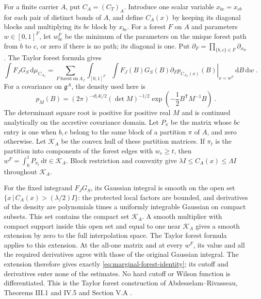 \documentclass[11pt]{article}
\newcommand{\dd}{\mathrm{d}}
\begin{document}
For a finite carrier $A$, put $C_A=(C_T)_A$. Introduce one scalar variable $x_{bc}=x_{cb}$ for each pair of distinct bonds of $A$, and define $C_A(x)$ by keeping its diagonal blocks and multiplying its $bc$ block by $x_{bc}$. For a forest $F$ on $A$ and parameters $w\in [0,1]^F$, let $w^F_{bc}$ be the minimum of the parameters on the unique forest path from $b$ to $c$, or zero if there is no path; its diagonal is one. Put $\partial_F=\prod_{\{b,c\}\in F}\partial_{x_{bc}}$. The Taylor forest formula gives
\begin{equation}\label{eq:marginal-forest-identity}
    \int F_JG_S\,\dd\mu_{C_{A_J}}
        =\sum_{F\ \mathrm{forest\ on}\ A_J}
            \int_{[0,1]^F}\int F_J(B)G_S(B)
                \left.\partial_F p_{C_{A_J}(x)}(B)\right|_{x=w^F}
                    \,\dd B\,\dd w\;.
\end{equation}
For a covariance on $\mathfrak g^A$, the density used here is
\begin{equation}\label{eq:marginal-density-definition}
    p_M(B)=(2\pi)^{-d|A|/2}(\det M)^{-1/2}
        \exp\left(-\frac{1}{2}B^{\mathsf T}M^{-1}B\right)\;.
\end{equation}
The determinant square root is positive for positive real $M$ and is continued analytically on the accretive covariance domain. Let $P_\pi$ be the matrix whose $bc$ entry is one when $b,c$ belong to the same block of a partition $\pi$ of $A$, and zero otherwise. Let $\mathcal K_A$ be the convex hull of these partition matrices. If $\pi_t$ is the partition into components of the forest edges with $w_e\geq t$, then $w^F=\int_0^1P_{\pi_t}\,\dd t\in \mathcal K_A$. Block restriction and convexity give $\lambda I\leq C_A(x)\leq\Lambda I$ throughout $\mathcal K_A$.

For the fixed integrand $F_JG_S$, its Gaussian integral is smooth on the open set $\{x\, | \,C_A(x)>(\lambda/2)I\}$: the protected local factors are bounded, and derivatives of the density are polynomials times a uniformly integrable Gaussian on compact subsets. This set contains the compact set $\mathcal K_A$. A smooth multiplier with compact support inside this open set and equal to one near $\mathcal K_A$ gives a smooth extension by zero to the full interpolation space. The Taylor forest formula applies to this extension. At the all-one matrix and at every $w^F$, its value and all the required derivatives agree with those of the original Gaussian integral. The extension therefore gives exactly \eqref{eq:marginal-forest-identity}; its cutoff and derivatives enter none of the estimates. No hard cutoff or Wilson function is differentiated. This is the Taylor forest construction of Abdesselam--Rivasseau, Theorems III.1 and IV.5 and Section V.A \cite{AbdesselamRivasseau}.
\end{document}
